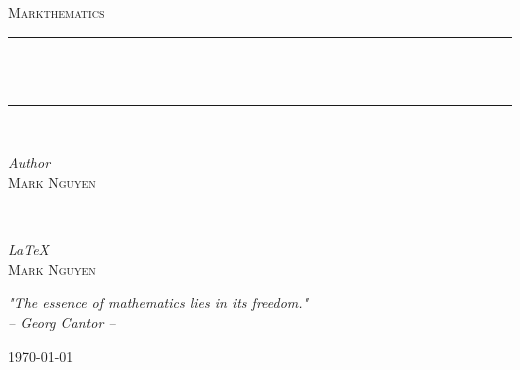\begin{titlepage}

    \newcommand{\HRule}{\rule{\linewidth}{0.5mm}} 
    \center
    
    
    \textsc{\LARGE Markthematics}\\[5cm]
    
    
    \HRule\\[0.4cm]
    
    \vspace{0.1cm}{\huge\bfseries MINIMALIST BOOK TEMPLATE}\\[0.05cm]
    
    \HRule\\[1.5cm]
    
    
    \begin{minipage}{0.4\textwidth}
        \begin{flushleft}
            \large
            \textit{Author}\\
            \textsc{Mark Nguyen}
        \end{flushleft}
    \end{minipage}
    ~
    \begin{minipage}{0.4\textwidth}
        \begin{flushright}
            \large
            \textit{\LaTeX}\\
            \textsc{Mark Nguyen}
        \end{flushright}
    \end{minipage}
    

    \vfill\vfill

    \textit{"The essence of mathematics lies in its freedom."}\\[0.25cm]
    \textit{-- Georg Cantor --}
    
    
    \vfill\vfill\vfill
    {\large\today}

    \vfill
    
\end{titlepage}